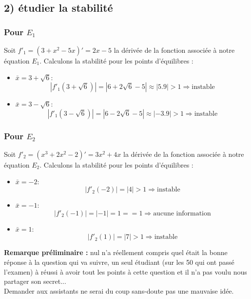 \documentclass[11pt,a4paper]{report}
\begin{document}
		\subsection*{2) étudier la stabilité}
		\subsubsection*{Pour $E_1$}
				Soit $f'_1 = (3 + x^2 -5x)' = 2x-5$ la dérivée de la fonction associée à notre équation $E_1$. Calculons la stabilité pour les points d'équilibres :
				\begin{itemize}
					\item $\bar{x} = 3 + \sqrt{6}$: \\
						\[
							|f'_1(3 + \sqrt{6})| = | 6 + 2\sqrt{6} - 5| \approx |5.9| > 1 \Rightarrow \text{instable}			
						\]
					\item $\bar{x} = 3 - \sqrt{6}$: \\
						\[
							|f'_1(3 - \sqrt{6})| = | 6 - 2\sqrt{6} - 5| \approx |-3.9| > 1 \Rightarrow \text{instable}			
						\]	
				\end{itemize}
				
			\subsubsection*{Pour $E_2$}
				Soit $f'_2 = (x^3 + 2x^2 - 2)' = 3x^2 + 4x$ la dérivée de la fonction associée à notre équation $E_2$. Calculons la stabilité pour les points d'équilibres :
				\begin{itemize}
					\item $\bar{x} = -2$: \\
						\[
							|f'_2(-2)| = |4| > 1 \Rightarrow \text{instable}			
						\]
					\item $\bar{x} = -1$: \\
						\[
							|f'_2(-1)| = |-1| = 1 == 1 \Rightarrow \text{aucune information}			
						\]	
					\item $\bar{x} = 1$: \\
						\[
							|f'_2(1)| = |7| > 1 \Rightarrow \text{instable}			
						\]
				\end{itemize}
				

		
		
		
		
	\pagebreak
	\textbf{Remarque préliminaire : } nul n'a réellement compris quel était la bonne réponse à la question qui va suivre, un seul étudiant (sur les 50 qui ont passé l'examen) à réussi à avoir tout les points à cette question et il n'a pas voulu nous partager son secret...\\
	Demander aux assistants ne serai du coup sans-doute pas une mauvaise idée.
\end{document}
